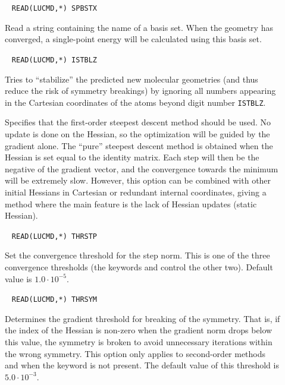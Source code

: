 \begin{description}
\item[]\verb| |
\newline
\verb|READ(LUCMD,*) SPBSTX|

Read a string containing the name of a basis set. When the geometry
has converged, a single-point energy will be calculated using this
basis set.

\item[]\verb| |
\newline
\verb|READ(LUCMD,*) ISTBLZ|

Tries to ``stabilize'' the predicted new molecular geometries (and
thus reduce the risk of symmetry breakings) by ignoring all numbers
appearing in the Cartesian coordinates of the atoms beyond digit
number \verb|ISTBLZ|.

\item[]
Specifies that the first-order steepest descent method should be
used. No update is done on the Hessian, so the optimization will be
guided by the gradient alone. The ``pure'' steepest descent method is
obtained when the Hessian is set equal to the identity matrix. Each
step will then be the negative of the gradient vector, and the
convergence towards the minimum will be extremely slow. However, this
option can be combined with other initial Hessians in Cartesian or
redundant internal coordinates, giving a method
where the main feature is the lack of Hessian updates (static
Hessian).

\item[]\verb| |
\newline
\verb|READ(LUCMD,*) THRSTP|

Set the convergence threshold for the step
norm. This is one of the
three convergence thresholds (the keywords  and
 control the other two). Default value is $1.0\cdot
10^{-5}$.

\item[]\verb| |
\newline
\verb|READ(LUCMD,*) THRSYM|

Determines the gradient threshold for breaking of the
symmetry. That is, if the index of the
Hessian is non-zero when the gradient norm
drops below this value, the symmetry is broken to avoid unnecessary
iterations within the wrong symmetry. This option only applies to
second-order methods and when the
keyword  is not present. The default value of this
threshold is $5.0\cdot 10^{-3}$.


\end{description}
